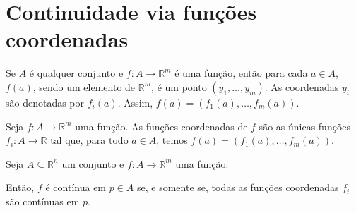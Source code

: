 \section{Continuidade via funções coordenadas}
Se $A$ é qualquer conjunto e $f: A \to \mathbb R^m$ é uma função, então para cada $a \in A$, $f(a)$, sendo um elemento de $\mathbb R^m$, é um ponto $(y_1, \dots, y_m)$.
As coordenadas $y_i$ são denotadas por $f_i(a)$.
Assim, $f(a) = (f_1(a), \dots, f_m(a))$.

\begin{definition}
    Seja $f: A \to \mathbb R^m$ uma função.
    As funções coordenadas de $f$ são as únicas funções $f_i: A \to \mathbb R$ tal que, para todo $a \in A$, temos $f(a) = (f_1(a), \dots, f_m(a))$.
\end{definition}

\begin{proposition}
    Seja $A\subseteq \mathbb R^n$ um conjunto e $f: A \to \mathbb R^m$ uma função.

    Então, $f$ é contínua em $p \in A$ se, e somente se, todas as funções coordenadas $f_i$ são contínuas em $p$.
\end{proposition}

